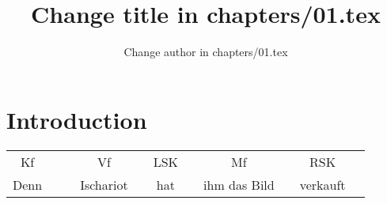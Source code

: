 \documentclass[output=paper]{LSP/langsci}
\author{Change author in chapters/01.tex}
\title{Change title in chapters/01.tex}
\begin{document}
\section{Introduction} 
 
 \citet{Chomsky1957}
 \lipsum 

 \begin{table}
\setlength{\tabcolsep}{1pt}
\small
\begin{tabular}{cc||ccccccccc}
Kf &&& Vf && LSK && Mf && RSK\\
\hhline{-~-~-~-~-~}
Denn &&& Ischariot && hat &&  ihm  das Bild && verkauft\\
\end{tabular}
\end{table}
 

\printbibliography[heading=subbibliography,notkeyword=this]
\end{document}

